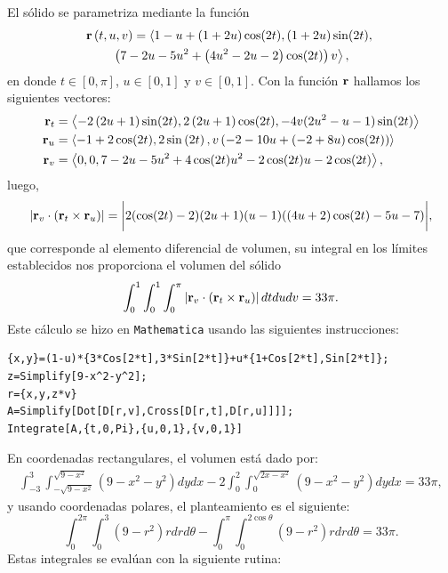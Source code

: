 El sólido se parametriza mediante la función
\begin{multline*}
{\bf r}\left( t,u,v\right) = \left\langle 1-u+\left( 1+2u\right) \cos (2t) ,\left( 1+2u\right) \sin (2t) , \right. \\
\left. \left( 7-2u-5u^2+\left( 4u^2-2u-2\right) \cos(2t)\right) v\right\rangle,
\end{multline*}
en donde $t\in [0,\pi]$, $u\in [0,1]$ y $v \in [0,1]$.
Con la función ${\bf r}$ hallamos los siguientes vectores:
\begin{align*}
{\bf r}_{t} &= \left\langle -2\left( 2u+1\right) \sin (2t),2\left( 2u+1\right) \cos (2t) ,-4v(2u^2-u-1)\sin (2t) \right\rangle \\
{\bf r}_{u} &= \left\langle -1+2\cos (2t) ,2\sin \left(2t\right) ,v\left( -2-10u+\left( -2+8u\right) \cos (2t) \right) \right\rangle \\
{\bf r}_{v} &= \left\langle 0,0,7-2u-5u^2+4\cos (2t)u^2-2\cos (2t) u-2\cos (2t) \right\rangle,
\end{align*}
luego,
\begin{gather*}
\left| {\bf r}_{v}\cdot ({\bf r}_{t}\times {\bf r}_{u}) \right| =\bigg| 2(\cos (2t)-2)(2u+1)(u-1) ((4u+2)\cos (2t) \linebreak -5u-7) \bigg|,
\end{gather*}
que corresponde al elemento diferencial de volumen, su integral en los
límites establecidos nos proporciona el volumen del sólido
\[\int_{0}^{1}\int_{0}^{1}\int_{0}^{\pi }\left| {\bf r}_{v}\cdot ({\bf r}_{t}\times {\bf r}_{u}) \right| dtdudv=33\pi.\]
Este cálculo se hizo en \verb"Mathematica" usando las siguientes instrucciones:

\begin{tcolorbox}[title=\bf Instrucción en \verb"Mathematica"]\begin{Verbatim}[formatcom=\letraverbatim]
{x,y}=(1-u)*{3*Cos[2*t],3*Sin[2*t]}+u*{1+Cos[2*t],Sin[2*t]};
z=Simplify[9-x^2-y^2];
r={x,y,z*v}
A=Simplify[Dot[D[r,v],Cross[D[r,t],D[r,u]]]];
Integrate[A,{t,0,Pi},{u,0,1},{v,0,1}]
\end{Verbatim}
\end{tcolorbox}

En coordenadas rectangulares, el volumen está dado por:
\begin{gather*}
  \int_{-3}^{3}\int_{-\sqrt{9-x^2}}^{\sqrt{9-x^2}}\left(9-x^2-y^2\right) dydx- 2\int_{0}^2\int_{0}^{\sqrt{2x-x^2}}\left(9-x^2-y^2\right)dydx= 33\pi,
\end{gather*}
y usando coordenadas polares, el planteamiento es el siguiente:
\[\int_{0}^{2\pi }\int_{0}^{3}\left( 9-r^2\right) rdrd\theta -\int_{0}^{\pi}\int_{0}^{2\cos \theta }\left( 9-r^2\right) rdrd\theta = 33\pi.\]
Estas integrales se evalúan con la siguiente rutina:

